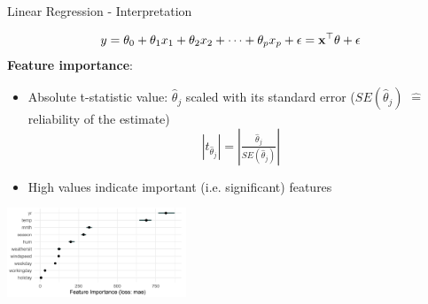 \documentclass[11pt,compress,t,notes=noshow, aspectratio=169, xcolor=table]{beamer}
\begin{document}
     
\begin{frame}[c]{Linear Regression - Interpretation}

$$y = \theta_0 + \theta_1 x_1 + \theta_2 x_2 + \dots + \theta_p x_p + \epsilon = \xv^\top \theta + \epsilon$$
    \textbf{Feature importance}:
    \begin{itemize}
        \item Absolute t-statistic value: $\hat\theta_j$ scaled with its standard error ($SE(\hat\theta_j)$ $\hat =$ reliability of the estimate) 
    $$|t_{\hat\theta_j}| = \left| \tfrac{\hat\theta_j}{SE(\hat\theta_j)} \right|$$
        \item High values indicate important (i.e. significant) features
    \end{itemize}
    \begin{center}
        \includegraphics[width=0.4\textwidth]{../01_intro/figure/bike-sharing02.png}
    \end{center}
\end{frame}
\end{document}
